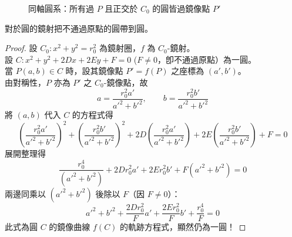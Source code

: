 \begin{figure}[htbp]
\centering
{}
\caption{同軸圓系：所有過 $P$ 且正交於 $C_0$ 的圓皆過鏡像點 $P'$}
\label{fig:b4-3-41}
\end{figure}

\begin{theorem}
對於圓的鏡射把不通過原點的圓帶到圓。
\end{theorem}

\begin{proof}
設 $C_0 : x^2 + y^2 = r_0^2$ 為鏡射圈，$f$ 為 $C_0$-鏡射。\\
設 $C : x^2 + y^2 + 2Dx + 2Ey + F = 0$ ($F \neq 0$，卽不通過原點）為一圓。\\
當 $P(a,b) \in C$ 時，設其鏡像點 $P' = f(P)$ 之座標為 $(a', b')$。\\
由對稱性，$P$ 亦為 $P'$ 之 $C_0$-鏡像點，故
\[ a = \frac{r_0^2 a'}{a'^2 + b'^2}, \qquad b = \frac{r_0^2 b'}{a'^2 + b'^2} \]
將 $(a,b)$ 代入 $C$ 的方程式得
\[ \left(\frac{r_0^2 a'}{a'^2 + b'^2}\right)^2 + \left(\frac{r_0^2 b'}{a'^2 + b'^2}\right)^2 + 2D\left(\frac{r_0^2 a'}{a'^2 + b'^2}\right) + 2E\left(\frac{r_0^2 b'}{a'^2 + b'^2}\right) + F = 0 \]
展開整理得
\[ \frac{r_0^4}{(a'^2 + b'^2)} + 2Dr_0^2 a' + 2Er_0^2 b' + F(a'^2 + b'^2) = 0 \]
兩邊同乘以 $(a'^2 + b'^2)$ 後除以 $F$（因 $F \neq 0$）：
\[ a'^2 + b'^2 + \frac{2Dr_0^2}{F}a' + \frac{2Er_0^2}{F}b' + \frac{r_0^4}{F} = 0 \]
此式為圓 $C$ 的鏡像曲線 $f(C)$ 的軌跡方程式，顯然仍為一圓！
\end{proof}

